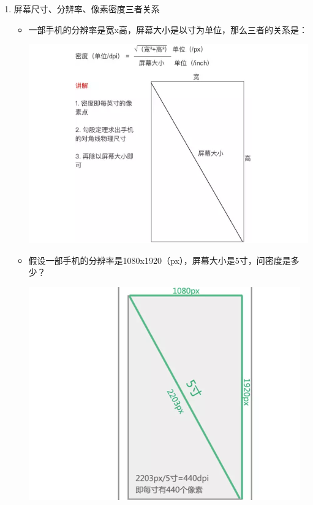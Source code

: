 \documentclass[9pt, b5paper]{article}
\begin{document}
\begin{enumerate}
\item 屏幕尺寸、分辨率、像素密度三者关系
\label{sec-1-4-3-1}
\begin{itemize}
\item 一部手机的分辨率是宽x高，屏幕大小是以寸为单位，那么三者的关系是：

\includegraphics[width=.9\linewidth]{./pic/density2.png}

\item 假设一部手机的分辨率是1080x1920（px），屏幕大小是5寸，问密度是多少？

\includegraphics[width=.9\linewidth]{./pic/density3.png}
\end{itemize}
\end{enumerate}
\end{document}
